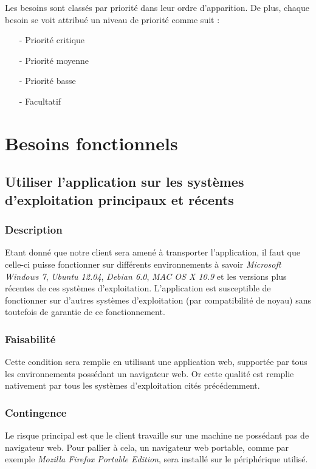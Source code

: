 \documentclass[a4paper,twoside,10pt]{report}
\begin{document}
Les besoins sont classés par priorité dans leur ordre d'apparition. De plus, chaque besoin se voit attribué un niveau de priorité comme suit :

\begin{itemize}
  \item[-] Priorité critique
  \item[-] Priorité moyenne
  \item[-] Priorité basse
  \item[-] Facultatif
\end{itemize}


\section{Besoins fonctionnels}\label{besoins_fonctionnels}

\subsection{Utiliser l’application sur les systèmes d’exploitation principaux et récents}\label{systems}

\subsubsection{Description}
Etant donné que notre client sera amené à transporter l’application, il faut que celle-ci puisse fonctionner sur différents environnements à savoir \textit{Microsoft Windows 7}, \textit{Ubuntu 12.04}, \textit{Debian 6.0}, \textit{MAC OS X 10.9} et les versions plus récentes de ces systèmes d’exploitation.
L’application est susceptible de fonctionner sur d’autres systèmes d’exploitation (par compatibilité de noyau) sans toutefois de garantie de ce fonctionnement. 
\subsubsection{Faisabilité}

Cette condition sera remplie en utilisant une application web, supportée par tous les environnements possédant un navigateur web. Or cette qualité est remplie nativement par tous les systèmes d’exploitation cités précédemment.

\subsubsection{Contingence}

Le risque principal est que le client travaille sur une machine ne possédant pas de navigateur web. Pour pallier à cela, un navigateur web portable, comme par exemple \textit{Mozilla Firefox Portable Edition}, sera installé sur le périphérique utilisé.
\end{document}
